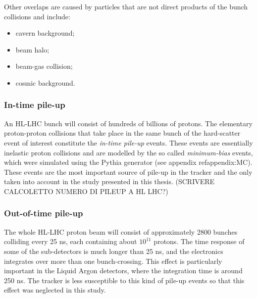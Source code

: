 \documentclass[a4paper,twoside,12pt]{article}
\begin{document}
Other overlaps are caused by particles that are not direct products of the bunch collisions and include:

\begin{itemize}
\item cavern background;
\item beam halo;
\item beam-gas collision;
\item cosmic background.
\end{itemize}

\subsubsection*{In-time pile-up}
An HL-LHC bunch will consist of hundreds of billions of protons. The elementary
proton-proton collisions that take place in the same bunch of the hard-scatter event of
interest constitute the \textit{in-time pile-up} events. These events are essentially inelastic proton collisions and are modelled by the so called
\textit{minimum-bias} events, which were simulated using the Pythia generator (see appendix ref{appendix:MC}). These events are the most
important source of pile-up in the tracker and the only taken into account in the study presented in this thesis.
(SCRIVERE CALCOLETTO NUMERO DI PILEUP A HL LHC?)   \\

\subsubsection*{Out-of-time pile-up}
The whole HL-LHC proton beam will consist of approximately 2800 bunches colliding every 25 ns, each containing about $10^{11}$ protons. The time response of some of the 
sub-detectors is much longer than 25 ns, and the electronics integrates over more than one
bunch-crossing. This effect is particularly important in the Liquid Argon detectors, where
the integration time is around 250 ns\cite{ATLAS_pileup}. The tracker is less susceptible to this kind of 
pile-up events so that this effect was neglected in this study.
\end{document}
